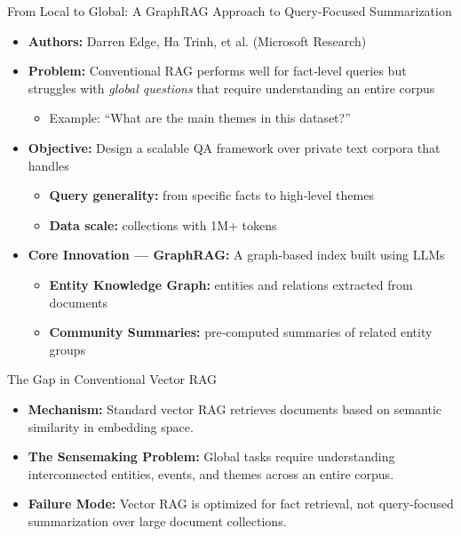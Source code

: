 \documentclass[aspectratio=169,xcolor=dvipsnames]{beamer}
\begin{document}
	\begin{frame}{From Local to Global: A GraphRAG Approach to Query-Focused Summarization}
		
		\vspace{0.4em}
		
		\begin{itemize}
			\item \textbf{Authors:} Darren Edge, Ha Trinh, et al. (Microsoft Research)
			
			\item \textbf{Problem:} Conventional RAG performs well for fact‑level queries but struggles with \emph{global questions} that require understanding an entire corpus
			\begin{itemize}
				\item Example: ``What are the main themes in this dataset?''
			\end{itemize}
			
			\item \textbf{Objective:} Design a scalable QA framework over private text corpora that handles
			\begin{itemize}
				\item \textbf{Query generality:} from specific facts to high‑level themes
				\item \textbf{Data scale:} collections with 1M+ tokens
			\end{itemize}
			
			\item \textbf{Core Innovation — GraphRAG:} A graph‑based index built using LLMs
			\begin{itemize}
				\item \textbf{Entity Knowledge Graph:} entities and relations extracted from documents
				\item \textbf{Community Summaries:} pre‑computed summaries of related entity groups
			\end{itemize}
		\end{itemize}
		
	\end{frame}
	
	\begin{frame}{The Gap in Conventional Vector RAG}
		
		\begin{itemize}
			\item \textbf{Mechanism:} Standard vector RAG retrieves documents based on semantic similarity in embedding space.
			
			\item \textbf{The Sensemaking Problem:} Global tasks require understanding interconnected entities, events, and themes across an entire corpus.
			
			\item \textbf{Failure Mode:} Vector RAG is optimized for fact retrieval, not query-focused summarization over large document collections.
		\end{itemize}
		
	\end{frame}
	
\end{document}

